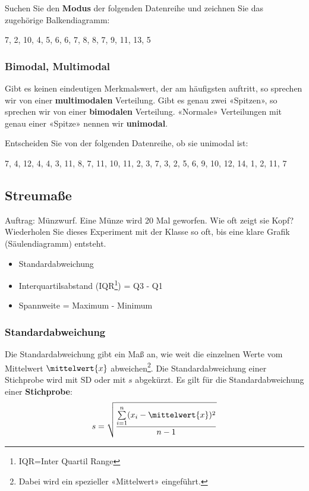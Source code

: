 Suchen Sie den \textbf{Modus} der folgenden Datenreihe und zeichnen Sie das
zugehörige Balkendiagramm:

7, 2, 10,  4, 5, 6, 6, 7, 8, 8, 7, 9, 11, 13, 5


\newpage
\subsubsection{Bimodal, Multimodal}
Gibt es keinen eindeutigen Merkmalswert, der am häufigsten auftritt,
so sprechen wir von einer \textbf{multimodalen} Verteilung. Gibt es
genau zwei «Spitzen», so sprechen wir von einer \textbf{bimodalen}
Verteilung. «Normale» Verteilungen mit genau einer «Spitze» nennen wir \textbf{unimodal}.



Entscheiden Sie von der folgenden Datenreihe, ob sie unimodal ist:

7, 4, 12, 4, 4, 3,  11, 8, 7, 11, 10, 11, 2, 3, 7, 3, 2, 5, 6, 9, 10, 12, 14, 1, 2, 11, 7

\newpage

\subsection{Streumaße}
Auftrag: Münzwurf. Eine Münze wird 20 Mal geworfen. Wie oft zeigt sie Kopf? Wiederholen Sie dieses Experiment mit der Klasse so oft, bis eine klare Grafik (Säulendiagramm) entsteht.


\begin{itemize}
\item Standardabweichung

\item Interquartilsabstand (IQR\footnote{IQR=Inter Quartil
    Range}) = Q3 - Q1

\item Spannweite = Maximum - Minimum

\end{itemize}

\subsubsection{Standardabweichung}
Die Standardabweichung gibt ein Maß an, wie weit die einzelnen Werte
vom Mittelwert $\mittelwert{x}$ abweichen\footnote{Dabei wird ein spezieller «Mittelwert»
  eingeführt.}.
Die Standardabweichung einer Stichprobe wird mit $\textrm{SD}$ oder
mit $s$ abgekürzt. Es gilt für die Standardabweichung einer
\textbf{Stichprobe}:
$$s = \sqrt{\frac{\sum\limits_{i=1}^n(x_i-\mittelwert{x})^2}{n-1}}$$

